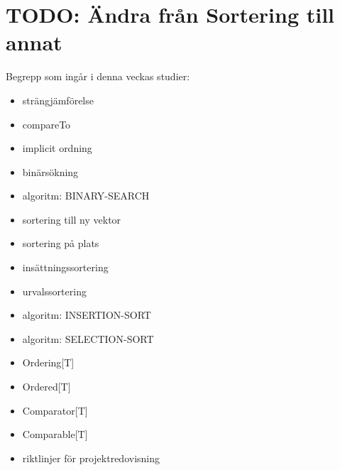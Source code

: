 \chapter{TODO: Ändra från Sortering till annat}\label{chapter:W12}
Begrepp som ingår i denna veckas studier:
\begin{itemize}[noitemsep,label={$\square$},leftmargin=*]
\item strängjämförelse
\item compareTo
\item implicit ordning
\item binärsökning
\item algoritm: BINARY-SEARCH
\item sortering till ny vektor
\item sortering på plats
\item insättningssortering
\item urvalssortering
\item algoritm: INSERTION-SORT
\item algoritm: SELECTION-SORT
\item Ordering[T]
\item Ordered[T]
\item Comparator[T]
\item Comparable[T]
\item riktlinjer för projektredovisning\end{itemize}
